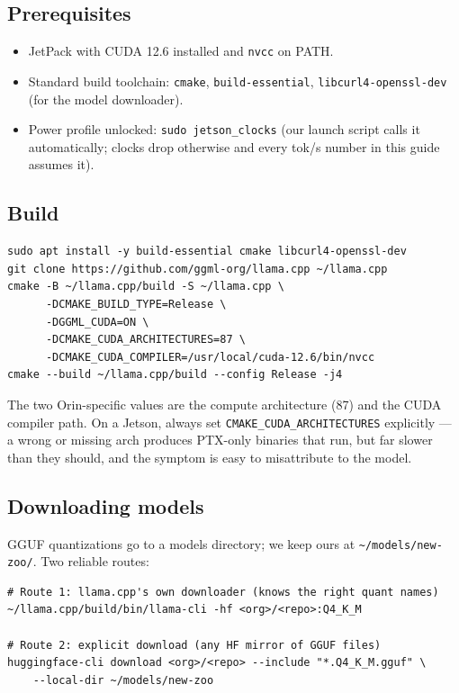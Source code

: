 \documentclass[11pt,a4paper]{article}
\begin{document}
\subsection{Prerequisites}

\begin{itemize}[leftmargin=1.4em,itemsep=1pt]
  \item JetPack with CUDA 12.6 installed and \texttt{nvcc} on PATH.
  \item Standard build toolchain: \texttt{cmake}, \texttt{build-essential}, \texttt{libcurl4-openssl-dev} (for the model downloader).
  \item Power profile unlocked: \texttt{sudo jetson\_clocks} (our launch script
        calls it automatically; clocks drop otherwise and every tok/s number
        in this guide assumes it).
\end{itemize}

\subsection{Build}

\begin{lstlisting}
sudo apt install -y build-essential cmake libcurl4-openssl-dev
git clone https://github.com/ggml-org/llama.cpp ~/llama.cpp
cmake -B ~/llama.cpp/build -S ~/llama.cpp \
      -DCMAKE_BUILD_TYPE=Release \
      -DGGML_CUDA=ON \
      -DCMAKE_CUDA_ARCHITECTURES=87 \
      -DCMAKE_CUDA_COMPILER=/usr/local/cuda-12.6/bin/nvcc
cmake --build ~/llama.cpp/build --config Release -j4
\end{lstlisting}

The two Orin-specific values are the compute architecture (87) and the CUDA
compiler path. On a Jetson, always set
\texttt{CMAKE\_CUDA\_ARCHITECTURES} explicitly --- a wrong or missing arch
produces PTX-only binaries that run, but far slower than they should, and
the symptom is easy to misattribute to the model.

\subsection{Downloading models}

GGUF quantizations go to a models directory; we keep ours at
\texttt{\textasciitilde/models/new-zoo/}. Two reliable routes:

\begin{lstlisting}
# Route 1: llama.cpp's own downloader (knows the right quant names)
~/llama.cpp/build/bin/llama-cli -hf <org>/<repo>:Q4_K_M

# Route 2: explicit download (any HF mirror of GGUF files)
huggingface-cli download <org>/<repo> --include "*.Q4_K_M.gguf" \
    --local-dir ~/models/new-zoo
\end{lstlisting}
\end{document}

